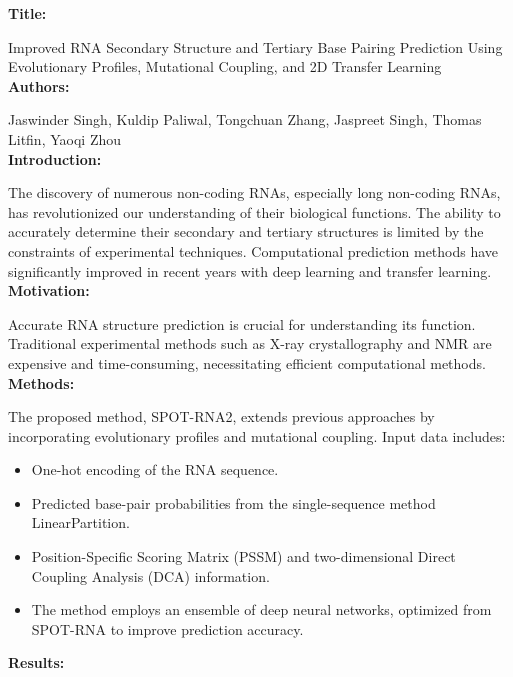 \documentclass{article}
\begin{document}
\begin{large}
\begin{large}
\begin{large}
\textbf{Title:}\par
Improved RNA Secondary Structure and Tertiary Base Pairing Prediction Using Evolutionary Profiles, Mutational Coupling, and 2D Transfer Learning \\[0.5em]

\textbf{Authors:} \par 
Jaswinder Singh, Kuldip Paliwal, Tongchuan Zhang, Jaspreet Singh, Thomas Litfin, Yaoqi Zhou \\[0.5em]

\textbf{Introduction:}\par

The discovery of numerous non-coding RNAs, especially long non-coding RNAs, has revolutionized our understanding of their biological functions.
The ability to accurately determine their secondary and tertiary structures is limited by the constraints of experimental techniques.
Computational prediction methods have significantly improved in recent years with deep learning and transfer learning.\\[0.5em]

\textbf{Motivation:}\par

Accurate RNA structure prediction is crucial for understanding its function.
Traditional experimental methods such as X-ray crystallography and NMR are expensive and time-consuming, necessitating efficient computational methods.\\[0.5em]

\textbf{Methods:}\par

The proposed method, SPOT-RNA2, extends previous approaches by incorporating evolutionary profiles and mutational coupling.
Input data includes:
    \begin{itemize}
        \item One-hot encoding of the RNA sequence.
        \item Predicted base-pair probabilities from the single-sequence method LinearPartition.
        \item Position-Specific Scoring Matrix (PSSM) and two-dimensional Direct Coupling Analysis (DCA) information.
        \item The method employs an ensemble of deep neural networks, optimized from SPOT-RNA to improve prediction accuracy. \\[0.5em]
    \end{itemize} 

\textbf{Results:}\par


\end{large}
\end{large}
\end{large}
\end{document}
